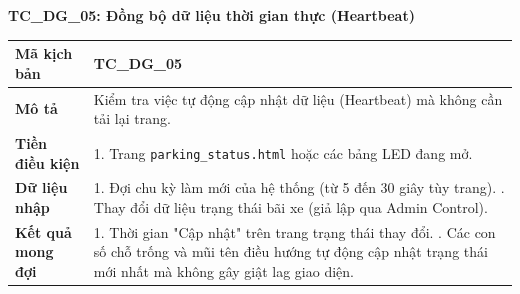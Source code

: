 \textbf{TC\_DG\_05: Đồng bộ dữ liệu thời gian thực (Heartbeat)}
\begin{table}[H]
    \centering
    \begin{tabularx}{\textwidth}{|l|X|}
        \hline
        \rowcolor[HTML]{EFEFEF} 
        \textbf{Mã kịch bản} & \textbf{TC\_DG\_05} \\ \hline
        \textbf{Mô tả} & Kiểm tra việc tự động cập nhật dữ liệu (Heartbeat) mà không cần tải lại trang. \\ \hline
        \textbf{Tiền điều kiện} & 1. Trang \texttt{parking\_status.html} hoặc các bảng LED đang mở. \\ \hline
        \textbf{Dữ liệu nhập} & 1. Đợi chu kỳ làm mới của hệ thống (từ 5 đến 30 giây tùy trang). \newline 2. Thay đổi dữ liệu trạng thái bãi xe (giả lập qua Admin Control). \\ \hline
        \textbf{Kết quả mong đợi} & 1. Thời gian "Cập nhật" trên trang trạng thái thay đổi. \newline 2. Các con số chỗ trống và mũi tên điều hướng tự động cập nhật trạng thái mới nhất mà không gây giật lag giao diện. \\ \hline
    \end{tabularx}
\end{table}
